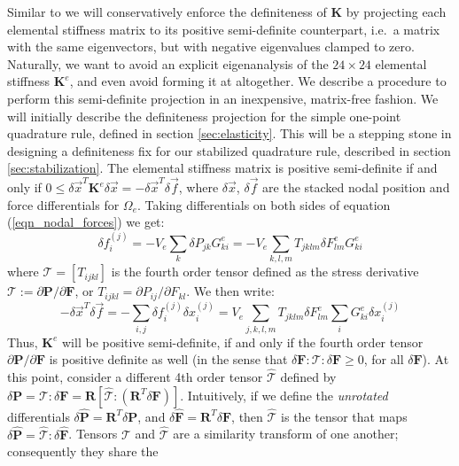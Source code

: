 Similar to \cite{teran:2005:quasistatics} we will conservatively enforce the definiteness of $\mathbf{K}$ by projecting each elemental stiffness matrix to its positive semi-definite
counterpart, i.e.\ a matrix with the same eigenvectors, but with negative eigenvalues clamped to zero. Naturally, we want to avoid an explicit eigenanalysis of the $24\times 24$
elemental stiffness $\mathbf{K}^e$, and even avoid forming it at altogether. We describe a procedure to perform this semi-definite projection in an inexpensive, matrix-free fashion. We
will initially describe the definiteness projection for the simple one-point quadrature rule, defined in section \ref{sec:elasticity}. This will be a stepping stone in designing a
definiteness fix for our stabilized quadrature rule, described in section \ref{sec:stabilization}. The elemental stiffness matrix is positive semi-definite if and only if
$0\leq\delta\vec{x}^T\mathbf{K}^e\delta\vec{x}=-\delta\vec{x}^T\delta\vec{f}$, where $\delta\vec{x}$, $\delta\vec{f}$ are the stacked nodal position and force differentials for
$\Omega_e$. Taking differentials on both sides of equation (\ref{eqn_nodal_forces}) we get: 
$$
\delta f_i^{(j)}
=-V_e\sum_k\delta P_{jk}G_{ki}^e
=-V_e\sum_{k,l,m}T_{jklm}\delta F^e_{lm}G_{ki}^e
$$
where $\mathcal{T}=[T_{ijkl}]$ is the fourth order tensor defined as the stress derivative $\mathcal{T}:=\partial\mathbf{P}/\partial\mathbf{F}$, or $T_{ijkl}=\partial P_{ij}/\partial
F_{kl}$. We then write:
$$
-\delta\vec{x}^T\delta\vec{f}=-\sum_{i,j}\delta f_i^{(j)}\delta x_i^{(j)}
=V_e\!\!\sum_{j,k,l,m}\!\!T_{jklm}\delta F^e_{lm}\sum_iG_{ki}^e\delta x_i^{(j)}
$$
Thus, $\mathbf{K}^e$ will be positive semi-definite, if and only if the fourth order tensor $\partial\mathbf{P}/\partial\mathbf{F}$ is positive definite as well (in the sense that
$\delta\mathbf{F}:\mathcal{T}:\delta\mathbf{F}\geq 0$, for all $\delta\mathbf{F}$). At this point, consider a different 4th order tensor $\hat{\mathcal{T}}$ defined by
$\delta\mathbf{P}=\mathcal{T}:\delta\mathbf{F}=\mathbf{R}[\hat{\mathcal{T}}:(\mathbf{R}^T\delta\mathbf{F})]$. Intuitively, if we define the \emph{unrotated} differentials
$\delta\hat{\mathbf{P}}=\mathbf{R}^T\delta\mathbf{P}$, and $\delta\hat{\mathbf{F}}=\mathbf{R}^T\delta\mathbf{F}$, then $\hat{\mathcal{T}}$ is the tensor that maps
$\delta\hat{\mathbf{P}}=\hat{\mathcal{T}}:\delta\hat{\mathbf{F}}$. Tensors $\mathcal{T}$ and $\hat{\mathcal{T}}$ are a similarity transform of one another; consequently they share the
